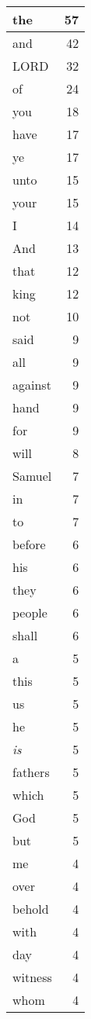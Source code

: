 \begin{center}
\begin{longtable}{l|r}
\hline \hline
\endlastfoot
the & 57 \\ \hline
and & 42 \\ \hline
LORD & 32 \\ \hline
of & 24 \\ \hline
you & 18 \\ \hline
have & 17 \\ \hline
ye & 17 \\ \hline
unto & 15 \\ \hline
your & 15 \\ \hline
I & 14 \\ \hline
And & 13 \\ \hline
that & 12 \\ \hline
king & 12 \\ \hline
not & 10 \\ \hline
said & 9 \\ \hline
all & 9 \\ \hline
against & 9 \\ \hline
hand & 9 \\ \hline
for & 9 \\ \hline
will & 8 \\ \hline
Samuel & 7 \\ \hline
in & 7 \\ \hline
to & 7 \\ \hline
before & 6 \\ \hline
his & 6 \\ \hline
they & 6 \\ \hline
people & 6 \\ \hline
shall & 6 \\ \hline
a & 5 \\ \hline
this & 5 \\ \hline
us & 5 \\ \hline
he & 5 \\ \hline
\emph{is} & 5 \\ \hline
fathers & 5 \\ \hline
which & 5 \\ \hline
God & 5 \\ \hline
but & 5 \\ \hline
me & 4 \\ \hline
over & 4 \\ \hline
behold & 4 \\ \hline
with & 4 \\ \hline
day & 4 \\ \hline
witness & 4 \\ \hline
whom & 4 \\ \hline

\end{longtable}
\end{center}
